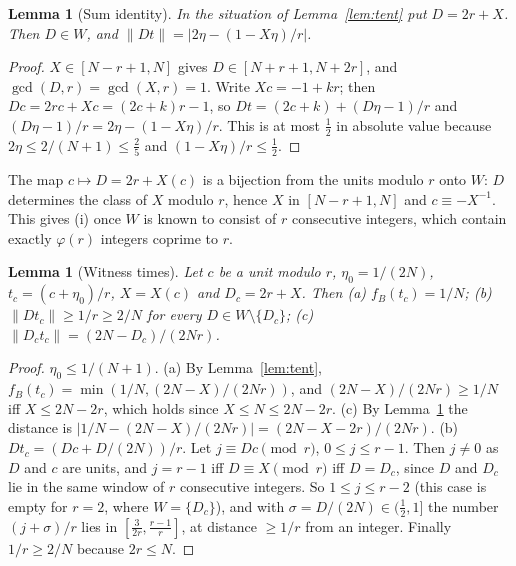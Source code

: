 \documentclass[11pt]{article}
\newtheorem{lemma}[theorem]{Lemma}
\theoremstyle{definition}
\theoremstyle{remark}
\newcommand{\nd}[1]{\lVert #1\rVert}
\begin{document}
\begin{lemma}[Sum identity]\label{lem:sum}
In the situation of Lemma~\ref{lem:tent} put $D=2r+X$. Then $D\in W$, and $\nd{Dt}=\bigl|2\eta-(1-X\eta)/r\bigr|$.
\end{lemma}
\begin{proof}
$X\in[N-r+1,N]$ gives $D\in[N+r+1,N+2r]$, and $\gcd(D,r)=\gcd(X,r)=1$. Write $Xc=-1+kr$; then $Dc=2rc+Xc=(2c+k)r-1$, so $Dt=(2c+k)+(D\eta-1)/r$ and $(D\eta-1)/r=2\eta-(1-X\eta)/r$. This is at most $\frac12$ in absolute value because $2\eta\le2/(N+1)\le\frac25$ and $(1-X\eta)/r\le\frac12$.
\end{proof}

The map $c\mapsto D=2r+X(c)$ is a bijection from the units modulo $r$ onto $W$: $D$ determines the class of $X$ modulo $r$, hence $X$ in $[N-r+1,N]$ and $c\equiv-X^{-1}$. This gives (i) once $W$ is known to consist of $r$ consecutive integers, which contain exactly $\varphi(r)$ integers coprime to $r$.

\begin{lemma}[Witness times]\label{lem:witw}
Let $c$ be a unit modulo $r$, $\eta_0=1/(2N)$, $t_c=(c+\eta_0)/r$, $X=X(c)$ and $D_c=2r+X$. Then (a) $f_B(t_c)=1/N$; (b) $\nd{Dt_c}\ge1/r\ge2/N$ for every $D\in W\setminus\{D_c\}$; (c) $\nd{D_ct_c}=(2N-D_c)/(2Nr)$.
\end{lemma}
\begin{proof}
$\eta_0\le1/(N+1)$. (a) By Lemma~\ref{lem:tent}, $f_B(t_c)=\min(1/N,(2N-X)/(2Nr))$, and $(2N-X)/(2Nr)\ge1/N$ iff $X\le2N-2r$, which holds since $X\le N\le2N-2r$. (c) By Lemma~\ref{lem:sum} the distance is $|1/N-(2N-X)/(2Nr)|=(2N-X-2r)/(2Nr)$. (b) $Dt_c=(Dc+D/(2N))/r$. Let $j\equiv Dc\pmod r$, $0\le j\le r-1$. Then $j\ne0$ as $D$ and $c$ are units, and $j=r-1$ iff $D\equiv X\pmod r$ iff $D=D_c$, since $D$ and $D_c$ lie in the same window of $r$ consecutive integers. So $1\le j\le r-2$ (this case is empty for $r=2$, where $W=\{D_c\}$), and with $\sigma=D/(2N)\in(\frac12,1]$ the number $(j+\sigma)/r$ lies in $[\frac3{2r},\frac{r-1}r]$, at distance $\ge1/r$ from an integer. Finally $1/r\ge2/N$ because $2r\le N$.
\end{proof}
\end{document}
